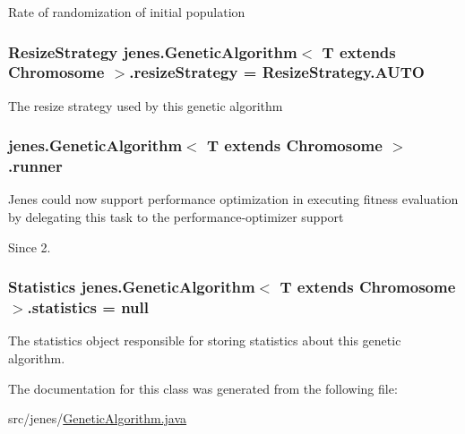 Rate of randomization of initial population \hypertarget{classjenes_1_1_genetic_algorithm_3_01_t_01extends_01_chromosome_01_4_a56f08a1d1f3355921b83f08745dbb3b3}{
\subsubsection[{resize\-Strategy}]{\setlength{\rightskip}{0pt plus 5cm}Resize\-Strategy jenes.\-Genetic\-Algorithm$<$ T extends Chromosome $>$.resize\-Strategy = {\bf Resize\-Strategy.\-A\-U\-T\-O}\hspace{0.3cm}{\ttfamily [protected]}}}\label{classjenes_1_1_genetic_algorithm_3_01_t_01extends_01_chromosome_01_4_a56f08a1d1f3355921b83f08745dbb3b3}
The resize strategy used by this genetic algorithm \hypertarget{classjenes_1_1_genetic_algorithm_3_01_t_01extends_01_chromosome_01_4_a9d6056090be623c86c46ad62d37ff164}{
\subsubsection[{runner}]{ jenes.\-Genetic\-Algorithm$<$ T extends Chromosome $>$.runner\hspace{0.3cm}{\ttfamily [private]}}}\label{classjenes_1_1_genetic_algorithm_3_01_t_01extends_01_chromosome_01_4_a9d6056090be623c86c46ad62d37ff164}
Jenes could now support performance optimization in executing fitness evaluation by delegating this task to the performance-\/optimizer support \begin{DoxySince}{Since}
2. 
\end{DoxySince}
\hypertarget{classjenes_1_1_genetic_algorithm_3_01_t_01extends_01_chromosome_01_4_afc23d5cbab5434f5ec5684cda9434b93}{
\subsubsection[{statistics}]{\setlength{\rightskip}{0pt plus 5cm}Statistics jenes.\-Genetic\-Algorithm$<$ T extends Chromosome $>$.statistics = null\hspace{0.3cm}{\ttfamily [protected]}}}\label{classjenes_1_1_genetic_algorithm_3_01_t_01extends_01_chromosome_01_4_afc23d5cbab5434f5ec5684cda9434b93}
The statistics object responsible for storing statistics about this genetic algorithm. 

The documentation for this class was generated from the following file\-:\begin{DoxyCompactItemize}
\item 
src/jenes/\hyperlink{_genetic_algorithm_8java}{Genetic\-Algorithm.\-java}\end{DoxyCompactItemize}
